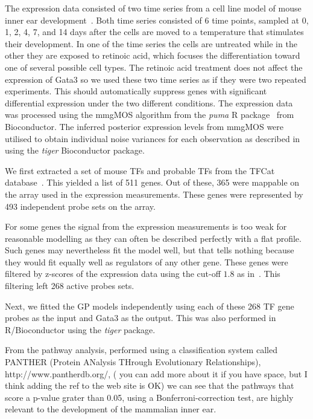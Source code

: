 \documentclass{article}
\begin{document}
The expression data consisted of two time series from a cell line
model of mouse inner ear development~\cite{Helyer2007}.  Both time series
consisted of 6 time points, sampled at 0, 1, 2, 4, 7, and 14 days
after the cells are moved to a temperature that stimulates their
development.  In one of the time series the cells are untreated while
in the other they are exposed to retinoic acid, which focuses the
differentiation toward one of several possible cell types.  The
retinoic acid treatment does not affect the expression of Gata3 so we
used these two time series as if they were two repeated experiments.
This should automatically suppress genes with significant differential
expression under the two different conditions.  The expression data
was processed using the mmgMOS algorithm from the \emph{puma} R
package~\cite{Liu:tractable04,Pearson:puma09} from Bioconductor.  The
inferred posterior expression levels from mmgMOS were utilised to
obtain individual noise variances for each observation as described
in~\cite{Honkela:modelbased10} using the \emph{tiger} Bioconductor
package. %

We first extracted a set of mouse TFs and probable TFs from the TFCat
database~\cite{Fulton2009}.  This yielded a list of 511 genes.  Out of
these, 365 were mappable on the array used in the expression
measurements.  These genes were represented by 493 independent probe
sets on the array.

For some genes the signal from the expression measurements is too weak
for reasonable modelling as they can often be described perfectly with
a flat profile.  Such genes may nevertheless fit the model well, but
that tells nothing because they would fit equally well as regulators
of any other gene.  These genes were filtered by z-scores of the
expression data using the cut-off $1.8$ as
in~\cite{Honkela:modelbased10}.  This filtering left 268 active probes
sets.

Next, we fitted the GP models independently using each of these 268 TF
gene probes as the input and Gata3 as the output.  This was also
performed in R/Bioconductor using the \emph{tiger} package.

From the pathway analysis, performed using a classification system
called PANTHER (Protein ANalysis THrough Evolutionary Relationships),
http://www.pantherdb.org/, ( you can add more about it if you have
space, but I think adding the ref to the web site is OK) we can see
that the pathways that score a p-value grater than 0.05, using a
Bonferroni-correction test, are highly relevant to the development of
the mammalian inner ear.
\end{document}

